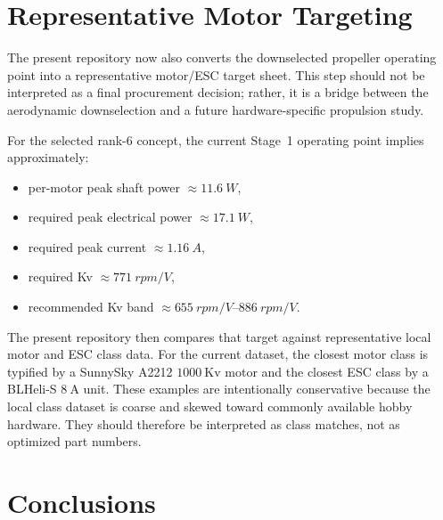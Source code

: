 \documentclass[conf]{new-aiaa}
\begin{document}
\section{Representative Motor Targeting}

The present repository now also converts the downselected propeller operating point into a representative motor/ESC target sheet. This step should not be interpreted as a final procurement decision; rather, it is a bridge between the aerodynamic downselection and a future hardware-specific propulsion study.

For the selected rank-6 concept, the current Stage~1 operating point implies approximately:
\begin{itemize}
\item per-motor peak shaft power \(\approx \SI{11.6}{W}\),
\item required peak electrical power \(\approx \SI{17.1}{W}\),
\item required peak current \(\approx \SI{1.16}{A}\),
\item required Kv \(\approx \SI{771}{rpm/V}\),
\item recommended Kv band \(\approx \SIrange{655}{886}{rpm/V}\).
\end{itemize}

The present repository then compares that target against representative local motor and ESC class data. For the current dataset, the closest motor class is typified by a SunnySky A2212 \(1000\ \mathrm{Kv}\) motor and the closest ESC class by a BLHeli-S \(8\ \mathrm{A}\) unit. These examples are intentionally conservative because the local class dataset is coarse and skewed toward commonly available hobby hardware. They should therefore be interpreted as class matches, not as optimized part numbers.

\section{Conclusions}
\end{document}
